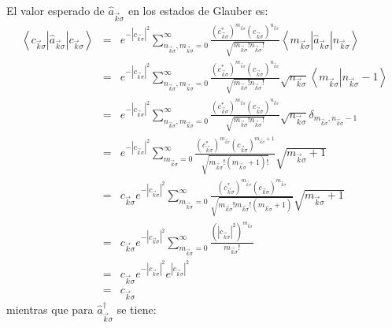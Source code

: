 El valor esperado de $\hat{a}_{\vec{k}\sigma}$ en los estados de Glauber es:%
\begin{eqnarray}
\left\langle c_{\vec{k}\sigma}\right| \hat{a}_{\vec{k}\sigma}\left|
c_{\vec{k}\sigma}\right> & = &e^{-\left| c_{\vec{k}\sigma}\right|
^{2}}\sum_{n_{\vec{k}\sigma},m_{\vec{k}\sigma}=0}^{\infty}\frac{\left(
c_{\vec{k}\sigma}^{\ast}\right) ^{m_{\vec{k}\sigma}}\left( c_{\vec{k}\sigma
}\right) ^{n_{\vec{k}\sigma}}}{\sqrt{m_{\vec{k}\sigma}!n_{\vec{k}\sigma}!}%
}\left\langle m_{\vec{k}\sigma}\right| \hat{a}_{\vec{k}\sigma}\left|
n_{\vec{k}\sigma}\right> \\
& = &e^{-\left| c_{\vec{k}\sigma}\right| ^{2}}\sum_{n_{\vec{k}\sigma
},m_{\vec{k}\sigma}=0}^{\infty}\frac{\left( c_{\vec{k}\sigma}^{\ast}\right)
^{m_{\vec{k}\sigma}}\left( c_{\vec{k}\sigma}\right) ^{n_{\vec{k}\sigma}}%
}{\sqrt{m_{\vec{k}\sigma}!n_{\vec{k}\sigma}!}}\sqrt{n_{\vec{k}\sigma}%
}\left\langle m_{\vec{k}\sigma}\right| \left. n_{\vec{k}\sigma
}-1\right> \\
& = &e^{-\left| c_{\vec{k}\sigma}\right| ^{2}}\sum_{n_{\vec{k}\sigma
},m_{\vec{k}\sigma}=0}^{\infty}\frac{\left( c_{\vec{k}\sigma}^{\ast}\right)
^{m_{\vec{k}\sigma}}\left( c_{\vec{k}\sigma}\right) ^{n_{\vec{k}\sigma}}%
}{\sqrt{m_{\vec{k}\sigma}!n_{\vec{k}\sigma}!}}\sqrt{n_{\vec{k}\sigma}}%
\delta_{m_{\vec{k}\sigma},n_{\vec{k}\sigma}-1}\\
& = &e^{-\left| c_{\vec{k}\sigma}\right| ^{2}}\sum_{m_{\vec{k}\sigma}%
=0}^{\infty}\frac{\left( c_{\vec{k}\sigma}^{\ast}\right) ^{m_{\vec{k}\sigma
}}\left( c_{\vec{k}\sigma}\right) ^{m_{\vec{k}\sigma}+1}}{\sqrt{m_{\vec
{k}\sigma}!\left( m_{\vec{k}\sigma}+1\right) !}}\sqrt{m_{\vec{k}\sigma}+1}\\
& = &c_{\vec{k}\sigma}e^{-\left| c_{\vec{k}\sigma}\right| ^{2}}%
\sum_{m_{\vec{k}\sigma}=0}^{\infty}\frac{\left( c_{\vec{k}\sigma}^{\ast
}\right) ^{m_{\vec{k}\sigma}}\left( c_{\vec{k}\sigma}\right) ^{m_{\vec
{k}\sigma}}}{\sqrt{m_{\vec{k}\sigma}!m_{\vec{k}\sigma}!\left( m_{\vec
{k}\sigma}+1\right) }}\sqrt{m_{\vec{k}\sigma}+1}\\
& = &c_{\vec{k}\sigma}e^{-\left| c_{\vec{k}\sigma}\right| ^{2}}%
\sum_{m_{\vec{k}\sigma}=0}^{\infty}\frac{\left( \left| c_{\vec{k}\sigma
}\right| ^{2}\right) ^{m_{\vec{k}\sigma}}}{m_{\vec{k}\sigma}!}\\
& = &c_{\vec{k}\sigma}e^{-\left| c_{\vec{k}\sigma}\right| ^{2}%
}e^{\left| c_{\vec{k}\sigma}\right| ^{2}}\\
& = &c_{\vec{k}\sigma}%
\end{eqnarray}
mientras que para $\hat{a}_{\vec{k}\sigma}^{\dagger}$ se tiene:%
